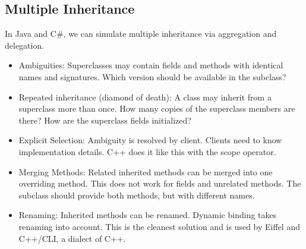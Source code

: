 \subsection{Multiple Inheritance}
\begin{mytitle} In Java and C\#, we can simulate multiple inheritance via aggregation and delegation. 
\end{mytitle}
\begin{mytitle} \hfill
\begin{itemize}
    \item Ambiguities: Superclasses may contain fields and methods with identical names and signatures. Which version should be available in the subclass? 
    \item Repeated inheritance (diamond of death): A class may inherit from a superclass more than once. How many copies of the superclass members are there? How are the superclass fields initialized?
\end{itemize}
\end{mytitle}
\begin{mytitle}[Ambiguity]\hfill
\begin{itemize}
    \item Explicit Selection: Ambiguity is resolved by client. Clients need to know implementation details. C++ does it like this with the scope operator.
    \item Merging Methods: Related inherited methods can be merged into one overriding method. This does not work for fields and unrelated methods. The subclass should provide both methods, but with different names.
    \item Renaming: Inherited methods can be renamed. Dynamic binding takes renaming into account. This is the cleanest solution and is used by Eiffel and C++/CLI, a dialect of C++.
\end{itemize}
\end{mytitle}
